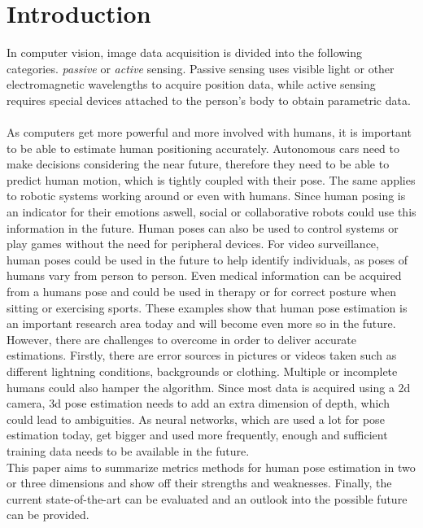 \section{Introduction}
In computer vision, image data acquisition is divided into the following categories. \emph{passive} or \emph{active} sensing. Passive sensing uses visible light or other electromagnetic wavelengths to acquire position data, while active sensing requires special devices attached to the person's body to obtain parametric data. 
\\\\
As computers get more powerful and more involved with humans, it is important to be able to estimate human positioning accurately. Autonomous cars need to make decisions considering the near future, therefore they need to be able to predict human motion, which is tightly coupled with their pose. The same applies to robotic systems working around or even with humans. Since human posing is an indicator for their emotions aswell, social or collaborative robots could use this information in the future. Human poses can also be used to control systems or play games without the need for peripheral devices. For video surveillance, human poses could be used in the future to help identify individuals, as poses of humans vary from person to person. Even medical information can be acquired from a humans pose and could be used in therapy or for correct posture when sitting or exercising sports. These examples show that human pose estimation is an important research area today and will become even more so in the future. \\
However, there are challenges to overcome in order to deliver accurate estimations. Firstly, there are error sources in pictures or videos taken such as different lightning conditions, backgrounds or clothing. Multiple or incomplete humans could also hamper the algorithm. Since most data is acquired using a 2d camera, 3d pose estimation needs to add an extra dimension of depth, which could lead to ambiguities. As neural networks, which are used a lot for pose estimation today, get bigger and used more frequently, enough and sufficient training data needs to be available in the future.\\
This paper aims to summarize metrics methods for human pose estimation in two or three dimensions and show off their strengths and weaknesses. Finally, the current state-of-the-art can be evaluated and an outlook into the possible future can be provided.